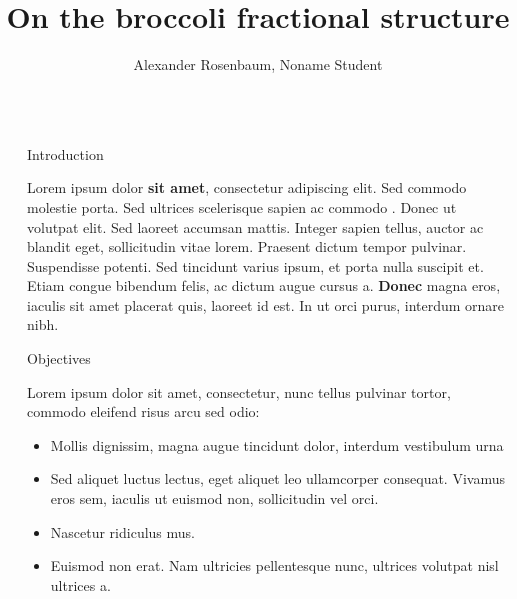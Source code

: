 \documentclass[]{beamer}
\title{On the broccoli fractional structure}
\author{Alexander Rosenbaum, Noname Student}
\begin{document}
\nocite{*} %

\begin{frame}[t]
    \begin{columns}[t] %
     
    \begin{column}{\lrmargin}\end{column} %
    
    \begin{column}{\onecolwid} %
     
    
    \begin{block}{Introduction}
    
    Lorem ipsum dolor \textbf{sit amet}, consectetur adipiscing elit. Sed commodo molestie porta. Sed ultrices scelerisque sapien ac commodo \cite{Black1976}. Donec ut volutpat elit. Sed laoreet accumsan mattis. Integer sapien tellus, auctor ac blandit eget, sollicitudin vitae lorem. Praesent dictum tempor pulvinar. Suspendisse potenti. Sed tincidunt varius ipsum, et porta nulla suscipit et. Etiam congue bibendum felis, ac dictum augue cursus a. \textbf{Donec} magna eros, iaculis sit amet placerat quis, laoreet id est. In ut orci purus, interdum ornare nibh. 
    
    \end{block}
    
    
    \begin{alertblock}{Objectives}
    
    Lorem ipsum dolor sit amet, consectetur, nunc tellus pulvinar tortor, commodo eleifend risus arcu sed odio:
    \begin{itemize}
    \item Mollis dignissim, magna augue tincidunt dolor, interdum vestibulum urna
    \item Sed aliquet luctus lectus, eget aliquet leo ullamcorper consequat. Vivamus eros sem, iaculis ut euismod non, sollicitudin vel orci.
    \item Nascetur ridiculus mus.  
    \item Euismod non erat. Nam ultricies pellentesque nunc, ultrices volutpat nisl ultrices a.
    \end{itemize}
    

\end{alertblock}
\end{column}
\end{columns}
\end{frame}
\end{document}
